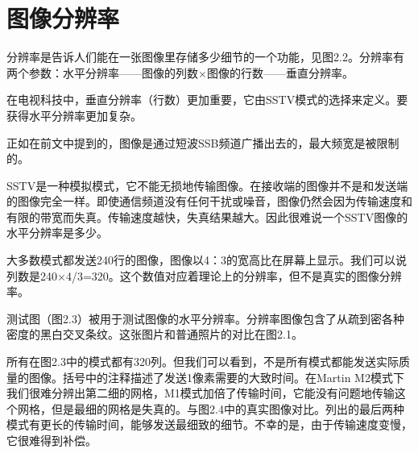 \section{图像分辨率}

分辨率是告诉人们能在一张图像里存储多少细节的一个功能，见图2.2。分辨率有两个参数：水平分辨率——图像的列数×图像的行数——垂直分辨率。

在电视科技中，垂直分辨率（行数）更加重要，它由SSTV模式的选择来定义。要获得水平分辨率更加复杂。

正如在前文中提到的，图像是通过短波SSB频道广播出去的，最大频宽是被限制的。

SSTV是一种模拟模式，它不能无损地传输图像。在接收端的图像并不是和发送端的图像完全一样。即使通信频道没有任何干扰或噪音，图像仍然会因为传输速度和有限的带宽而失真。传输速度越快，失真结果越大。因此很难说一个SSTV图像的水平分辨率是多少。

大多数模式都发送240行的图像，图像以4：3的宽高比在屏幕上显示。我们可以说列数是240×4/3=320。这个数值对应着理论上的分辨率，但不是真实的图像分辨率。

测试图（图2.3）被用于测试图像的水平分辨率。分辨率图像包含了从疏到密各种密度的黑白交叉条纹。这张图片和普通照片的对比在图2.1。

所有在图2.3中的模式都有320列。但我们可以看到，不是所有模式都能发送实际质量的图像。括号中的注释描述了发送1像素需要的大致时间。在Martin M2模式下我们很难分辨出第二细的网格，M1模式加倍了传输时间，它能没有问题地传输这个网格，但是最细的网格是失真的。与图2.4中的真实图像对比。列出的最后两种模式有更长的传输时间，能够发送最细致的细节。不幸的是，由于传输速度变慢，它很难得到补偿。

